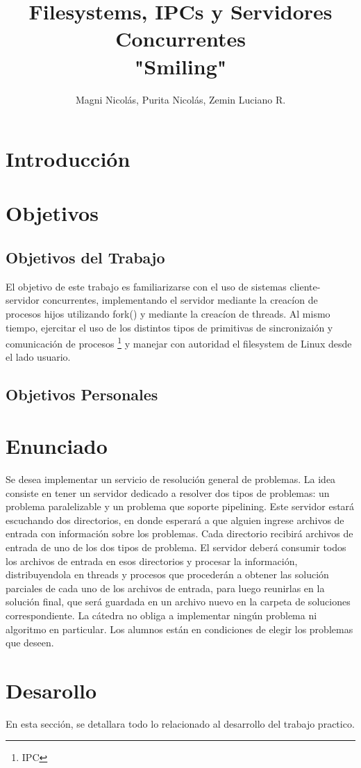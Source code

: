 \documentclass[10pt,a4paper]{article}
\author{Magni Nicol\'as, Purita Nicol\'as, Zemin Luciano R.  }
\title{Filesystems, IPCs y Servidores Concurrentes\\ "Smiling"}
\begin{document}
\maketitle
\newpage
\tableofcontents
\clearpage
\section{Introducci\'on}
\section{Objetivos}
\subsection{Objetivos del Trabajo}
El objetivo de este trabajo es familiarizarse con el uso de sistemas cliente- servidor concurrentes, implementando el servidor mediante la creac\'ion de procesos hijos utilizando fork() y mediante la creac\'ion de threads. Al mismo tiempo, ejercitar el uso de los distintos tipos de primitivas de sincronizai\'on y comunicaci\'on de procesos \footnote{IPC} y manejar con autoridad el filesystem de Linux desde el lado usuario.
\subsection{Objetivos Personales}
\section{Enunciado}
Se desea implementar un servicio de resoluci\'on general de problemas. La idea consiste en tener un servidor dedicado a resolver dos tipos de problemas: un problema paralelizable y un problema que soporte pipelining. Este servidor estar\'a escuchando dos directorios, en donde esperar\'a a que alguien ingrese archivos de entrada con informaci\'on sobre los problemas. Cada directorio recibir\'a archivos de entrada de uno de los dos tipos de problema.
El servidor deber\'a consumir todos los archivos de entrada en esos directorios y procesar la informaci\'on, distribuyendola en threads y procesos que proceder\'an a obtener las soluci\'on parciales de cada uno de los archivos de entrada, para luego reunirlas en la soluci\'on final, que ser\'a guardada en un archivo nuevo en la carpeta de soluciones correspondiente.
La c\'atedra no obliga a implementar ning\'un problema ni algoritmo en particular. Los alumnos est\'an en condiciones de elegir los problemas que deseen.
\section{Desarollo}
En esta secci\'on, se detallara todo lo relacionado al desarrollo del trabajo practico.
\end{document}

